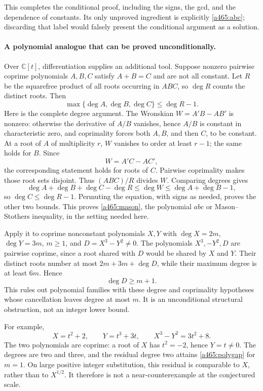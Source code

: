 \documentclass[11pt]{article}
\begin{document}
This completes the conditional proof, including the signs, the gcd, and the dependence of constants. Its only unproved ingredient is explicitly \eqref{a465:abc}; discarding that label would falsely present the conditional argument as a solution.

\paragraph{A polynomial analogue that can be proved unconditionally.}
Over $\mathbb C[t]$, differentiation supplies an additional tool. Suppose nonzero pairwise coprime polynomials $A,B,C$ satisfy $A+B=C$ and are not all constant. Let $R$ be the squarefree product of all roots occurring in $ABC$, so $\deg R$ counts the distinct roots. Then
\begin{equation}\label{a465:mason}
              \max\{\deg A,\deg B,\deg C\}\leq\deg R-1.
\end{equation}
Here is the complete degree argument. The Wronskian $W=A'B-AB'$ is nonzero: otherwise the derivative of $A/B$ vanishes, hence $A/B$ is constant in characteristic zero, and coprimality forces both $A,B$, and then $C$, to be constant. At a root of $A$ of multiplicity $r$, $W$ vanishes to order at least $r-1$; the same holds for $B$. Since
\[
                      W=A'C-AC',
\]
the corresponding statement holds for roots of $C$. Pairwise coprimality makes those root sets disjoint. Thus $(ABC)/R$ divides $W$. Comparing degrees gives
\[
 \deg A+\deg B+\deg C-\deg R
       \leq\deg W\leq\deg A+\deg B-1,
\]
so $\deg C\leq\deg R-1$. Permuting the equation, with signs as needed, proves the other two bounds. This proves \eqref{a465:mason}, the polynomial $abc$ or Mason--Stothers inequality, in the setting needed here.

Apply it to coprime nonconstant polynomials $X,Y$ with $\deg X=2m$, $\deg Y=3m$, $m\geq1$, and $D=X^3-Y^2\ne0$. The polynomials $X^3,-Y^2,D$ are pairwise coprime, since a root shared with $D$ would be shared by $X$ and $Y$. Their distinct roots number at most $2m+3m+\deg D$, while their maximum degree is at least $6m$. Hence
\begin{equation}\label{a465:polygap}
                              \deg D\geq m+1.
\end{equation}
This rules out polynomial families with these degree and coprimality hypotheses whose cancellation leaves degree at most $m$. It is an unconditional structural obstruction, not an integer lower bound.

For example,
\[
 X=t^2+2,\qquad Y=t^3+3t,
 \qquad X^3-Y^2=3t^2+8.
\]
The two polynomials are coprime: a root of $X$ has $t^2=-2$, hence $Y=t\ne0$. The degrees are two and three, and the residual degree two attains \eqref{a465:polygap} for $m=1$. On large positive integer substitution, this residual is comparable to $X$, rather than to $X^{1/2}$. It therefore is not a near-counterexample at the conjectured scale.
\end{document}
